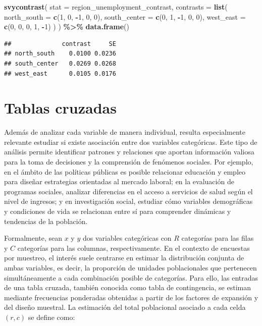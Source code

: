 \documentclass[
  spanish,
  12pt,
]{book}
\newenvironment{Shaded}{\begin{snugshade}}{\end{snugshade}}
\newcommand{\AttributeTok}[1]{\textcolor[rgb]{0.13,0.29,0.53}{#1}}
\newcommand{\DecValTok}[1]{\textcolor[rgb]{0.00,0.00,0.81}{#1}}
\newcommand{\FunctionTok}[1]{\textcolor[rgb]{0.13,0.29,0.53}{\textbf{#1}}}
\newcommand{\NormalTok}[1]{#1}
\newcommand{\SpecialCharTok}[1]{\textcolor[rgb]{0.81,0.36,0.00}{\textbf{#1}}}
\begin{document}
\begin{Shaded}
\begin{Highlighting}[]
\FunctionTok{svycontrast}\NormalTok{(}
  \AttributeTok{stat =}\NormalTok{ region\_unemployment\_contrast,}
  \AttributeTok{contrasts =} \FunctionTok{list}\NormalTok{(}
    \AttributeTok{north\_south =} \FunctionTok{c}\NormalTok{(}\DecValTok{1}\NormalTok{, }\DecValTok{0}\NormalTok{, }\SpecialCharTok{{-}}\DecValTok{1}\NormalTok{, }\DecValTok{0}\NormalTok{, }\DecValTok{0}\NormalTok{),}
    \AttributeTok{south\_center =} \FunctionTok{c}\NormalTok{(}\DecValTok{0}\NormalTok{, }\DecValTok{1}\NormalTok{, }\SpecialCharTok{{-}}\DecValTok{1}\NormalTok{, }\DecValTok{0}\NormalTok{, }\DecValTok{0}\NormalTok{),}
    \AttributeTok{west\_east =} \FunctionTok{c}\NormalTok{(}\DecValTok{0}\NormalTok{, }\DecValTok{0}\NormalTok{, }\DecValTok{0}\NormalTok{, }\DecValTok{1}\NormalTok{, }\SpecialCharTok{{-}}\DecValTok{1}\NormalTok{)}
\NormalTok{  )}
\NormalTok{) }\SpecialCharTok{\%\textgreater{}\%}
  \FunctionTok{data.frame}\NormalTok{()}
\end{Highlighting}
\end{Shaded}

\begin{verbatim}
##              contrast     SE
## north_south    0.0100 0.0236
## south_center   0.0269 0.0268
## west_east      0.0105 0.0176
\end{verbatim}

\section{Tablas cruzadas}\label{tablas-cruzadas}

Además de analizar cada variable de manera individual, resulta especialmente relevante estudiar si existe asociación entre dos variables categóricas. Este tipo de análisis permite identificar patrones y relaciones que aportan información valiosa para la toma de decisiones y la comprensión de fenómenos sociales. Por ejemplo, en el ámbito de las políticas públicas es posible relacionar educación y empleo para diseñar estrategias orientadas al mercado laboral; en la evaluación de programas sociales, analizar diferencias en el acceso a servicios de salud según el nivel de ingresos; y en investigación social, estudiar cómo variables demográficas y condiciones de vida se relacionan entre sí para comprender dinámicas y tendencias de la población.

Formalmente, sean \(x\) y \(y\) dos variables categóricas con \(R\) categorías para las filas y \(C\) categorías para las columnas, respectivamente. En el contexto de encuestas por muestreo, el interés suele centrarse en estimar la distribución conjunta de ambas variables, es decir, la proporción de unidades poblacionales que pertenecen simultáneamente a cada combinación posible de categorías. Para ello, las entradas de una tabla cruzada, también conocida como tabla de contingencia, se estiman mediante frecuencias ponderadas obtenidas a partir de los factores de expansión y del diseño muestral. La estimación del total poblacional asociado a cada celda \((r,c)\) se define como:
\end{document}
